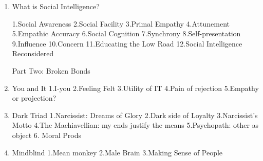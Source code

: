 \documentclass[11pt]{article}
\begin{document}
\begin{enumerate}
\item \tiny What is Social Intelligence? 

1.Social Awareness  
2.Social Facility 
3.Primal Empathy 
4.Attunement 
5.Empathic Accuracy 
6.Social Cognition 
7.Synchrony 
8.Self-presentation 
9.Influence 
10.Concern 
11.Educating the Low Road 
12.Social Intelligence Reconsidered 

Part Two: Broken Bonds 

\item \tiny You and It
1.I-you 
2.Feeling Felt
3.Utility of IT
4.Pain of rejection 
5.Empathy or projection? 

\item \tiny Dark Triad 
1.Narcissist: Dreams of Glory 
2.Dark side of Loyalty 
3.Narcissist’s Motto 
4.The Machiavellian: my ends justify the means 
5.Psychopath: other as object
6. Moral Prods 

\item \tiny Mindblind
1.Mean monkey
2.Male Brain 
3.Making Sense of People 
\end{enumerate} 
\end{document}
